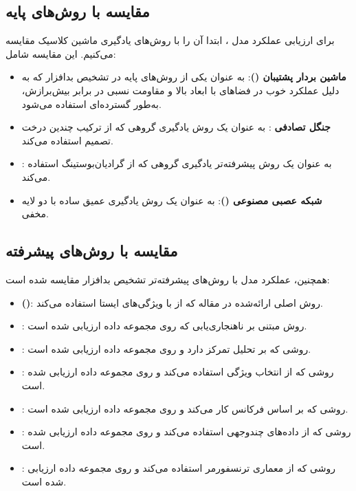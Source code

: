 \subsection{مقایسه با روش‌های پایه}
برای ارزیابی عملکرد مدل ، ابتدا آن را با روش‌های یادگیری ماشین کلاسیک مقایسه می‌کنیم. این مقایسه شامل:
\begin{itemize}
    \renewcommand{\labelitemi}{\lr{$\bullet$}}
    \item \textbf{ماشین بردار پشتیبان ()}: به عنوان یکی از روش‌های پایه در تشخیص بدافزار که به دلیل عملکرد خوب در فضاهای با ابعاد بالا و مقاومت نسبی در برابر بیش‌برازش، به‌طور گسترده‌ای استفاده می‌شود.
    \item \textbf{جنگل تصادفی }: به عنوان یک روش یادگیری گروهی که از ترکیب چندین درخت تصمیم استفاده می‌کند.
    \item \textbf{}: به عنوان یک روش پیشرفته‌تر یادگیری گروهی که از گرادیان‌بوستینگ استفاده می‌کند.
    \item \textbf{شبکه عصبی مصنوعی ()}: به عنوان یک روش یادگیری عمیق ساده با دو لایه مخفی.
\end{itemize}

\subsection{مقایسه با روش‌های پیشرفته}
همچنین، عملکرد مدل  با روش‌های پیشرفته‌تر تشخیص بدافزار مقایسه شده است:
\begin{itemize}
    \renewcommand{\labelitemi}{\lr{$\bullet$}}
    \item \textbf{ ()}: روش اصلی ارائه‌شده در مقاله  که از  با ویژگی‌های ایستا استفاده می‌کند.
    \item \textbf{}: روش مبتنی بر ناهنجاری‌یابی که روی مجموعه داده  ارزیابی شده است.
    \item \textbf{}: روشی که بر تحلیل  تمرکز دارد و روی مجموعه داده  ارزیابی شده است.
    \item \textbf{}: روشی که از انتخاب ویژگی استفاده می‌کند و روی مجموعه داده  ارزیابی شده است.
    \item \textbf{}: روشی که بر اساس فرکانس  کار می‌کند و روی مجموعه داده  ارزیابی شده است.
    \item \textbf{}: روشی که از داده‌های چندوجهی استفاده می‌کند و روی مجموعه داده  ارزیابی شده است.
    \item \textbf{}: روشی که از معماری ترنسفورمر استفاده می‌کند و روی مجموعه داده  ارزیابی شده است.
\end{itemize}

